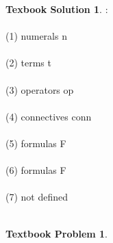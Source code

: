 \documentclass[10pt]{article}
\theoremstyle{definition}
\newtheorem{bp}{Textbook Problem}
\newtheorem{ts}{Texbook Solution}
\begin{document}
  \begin{ts}:
  \\
  \\
  (1) numerals n
  \\
  \\
  (2) terms t
  \\
  \\
  (3) operators op
  \\
  \\
  (4) connectives conn
  \\
  \\
  (5) formulas F
  \\
  \\
  (6) formulas F
  \\
  \\
  (7) not defined
  \\
  \\
  \end{ts}
  
  \begin{bp}
  \end{bp}
  
  
  
  
\end{document}
